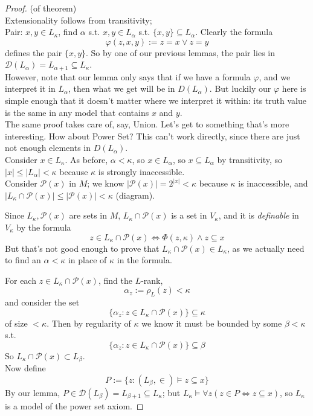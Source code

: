 \documentclass[a4paper]{article}
\begin{document}
\begin{proof} (of theorem)\\
Extensionality follows from transitivity;\\
Pair: $x,y \in L_\kappa$, find $\alpha$ s.t. $x,y \in L_\alpha$ s.t. $\{x,y\} \subseteq L_\alpha$. Clearly the formula
\[
\varphi(z,x,y) := z=x \vee z=y
\]
defines the pair $\{x,y\}$. So by one of our previous lemmas, the pair lies in $\mathcal{D}(L_\alpha) = L_{\alpha+1} \subseteq L_\kappa$.\\
However, note that our lemma only says that if we have a formula $\varphi$, and we interpret it in $L_\alpha$, then what we get will be in $D(L_\alpha)$. But luckily our $\varphi$ here is simple enough that it doesn't matter where we interpret it within: its truth value is the same in any model that contains $x$ and $y$.\\
The same proof takes care of, say, Union. Let's get to something that's more interesting. How about Power Set? This can't work directly, since there are just not enough elements in $D(L_\alpha)$.\\
Consider $x \in L_\kappa$. As before, $\alpha < \kappa$, so $x \in L_\alpha$, so $x \subseteq L_\alpha$ by transitivity, so $|x| \leq |L_\alpha| < \kappa$ because $\kappa$ is strongly inaccessible.\\
Consider $\mathcal{P}(x)$ in $M$; we know $|\mathcal{P}(x)| = 2^{|x|} < \kappa$ because $\kappa$ is inaccessible, and $|L_\kappa \cap \mathcal{P}(x)| \leq |\mathcal{P}(x)| < \kappa$ (diagram).
\begin{rem}
Since $L_\kappa,\mathcal{P}(x)$ are sets in $M$, $L_\kappa \cap \mathcal{P}(x)$ is a set in $V_\kappa$, and it is \emph{definable} in $V_\kappa$ by the formula
\[
z \in L_\kappa \cap \mathcal{P}(x) \iff \Phi(z,\kappa) \wedge z \subseteq x
\]
But that's not good enough to prove that $L_\kappa \cap \mathcal{P}(x) \in L_\kappa$, as we actually need to find an $\alpha<\kappa$ in place of $\kappa$ in the formula.
\end{rem}
For each $z \in L_\kappa \cap \mathcal{P}(x)$, find the $L$-rank,
\[
\alpha_z:=\rho_L(z) < \kappa
\]
and consider the set
\[
\{\alpha_z: z \in L_\kappa \cap \mathcal{P}(x)\} \subseteq \kappa
\]
of size $<\kappa$. Then by regularity of $\kappa$ we know it must be bounded by some $\beta < \kappa$ s.t.
\[
\{\alpha_z: z \in L_\kappa \cap \mathcal{P}(x)\} \subseteq \beta
\]
So $L_\kappa \cap \mathcal{P}(x) \subset L_\beta$.\\
Now define
\[
P:=\{z: (L_\beta,\in) \vDash z \subseteq x\}
\]
By our lemma, $P \in \mathcal{D}(L_\beta) = L_{\beta+1} \subseteq L_\kappa$; but $L_\kappa \vDash \forall z (z \in P \iff z \subseteq x)$, so $L_\kappa$ is a model of the power set axiom.
\end{proof}
\end{document}
